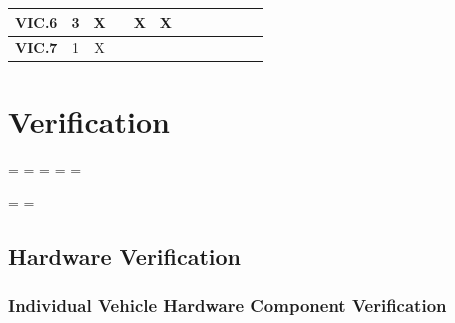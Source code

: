 \documentclass [10pt]{article}
\begin{document}
\begin{center}
\begin{tabularx} {.88\textwidth} {|c|c|c|c|c|c|c|c|c|c|c|c|}
  \textbf{VIC.6}&3& X& & X& X& & & & & &    \\ \hline
 \textbf{VIC.7}&1& X& & & & & & & & &   \\ \hline

 
 \end{tabularx}


\end{center}





\section {Verification}











\newpage
\pagestyle{fancy}

\paperwidth=\pdfpageheight
\paperheight=\pdfpagewidth
\pdfpageheight=\paperheight
\pdfpagewidth=\paperwidth
\headwidth=\textheight



\begingroup

\vsize=\textwidth
\hsize=\textheight



\break

\subsection{Hardware Verification}
\subsubsection{Individual Vehicle Hardware Component Verification}
 
\end{document}
